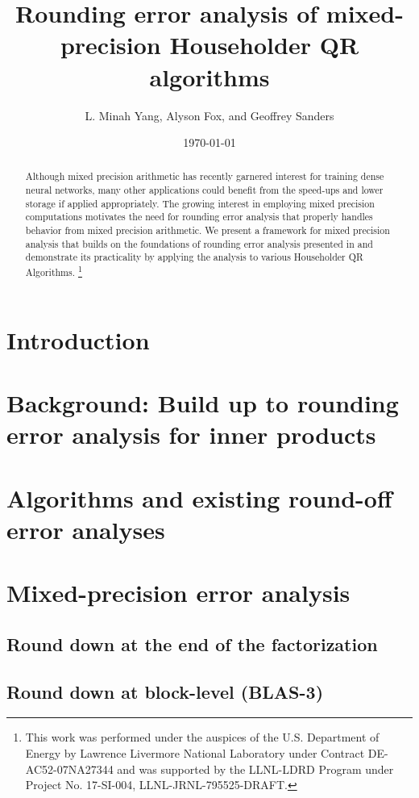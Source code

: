 \documentclass[review,onefignum,onetabnum]{siamart190516}
\title{Rounding error analysis of mixed-precision Householder QR algorithms}
\author{L. Minah Yang, Alyson Fox, and Geoffrey Sanders}
\date{\today}
\newcommand\blfootnote[1]{%
	\begingroup
	\renewcommand\thefootnote{}\footnote{#1}%
	\addtocounter{footnote}{-1}%
	\endgroup
}
\begin{document}
\maketitle
\begin{abstract}
	Although mixed precision arithmetic has recently garnered interest for training dense neural networks, many other applications could benefit from the  speed-ups and lower storage if applied appropriately. 
	The growing interest in employing mixed precision computations motivates the need for rounding error analysis that properly handles behavior from mixed precision arithmetic.
	We present a framework for mixed precision analysis that builds on the foundations of rounding error analysis presented in \cite{Higham2002} and demonstrate its practicality by applying the analysis to various Householder QR Algorithms. 
	\blfootnote{This work was performed under the auspices of the U.S. Department of Energy by Lawrence Livermore National Laboratory under Contract DE-AC52-07NA27344 and was supported by the LLNL-LDRD Program under Project No. 17-SI-004, LLNL-JRNL-795525-DRAFT.}
\end{abstract}
\section{Introduction}\label{sec:intro}

\section{Background: Build up to rounding error analysis for inner products}\label{sec:background}

\section{Algorithms and existing round-off error analyses}\label{sec:algo}

\section{Mixed-precision error analysis}\label{sec:mpanalysis}

\subsection{Round down at the end of the factorization}
\subsection{Round down at block-level (BLAS-3)}
\end{document}
